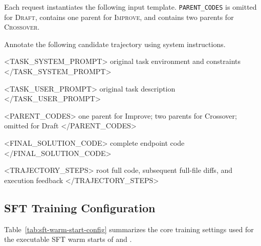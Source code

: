 Each request instantiates the following input template. \texttt{PARENT\_CODES} is omitted for \textsc{Draft}, contains one parent for \textsc{Improve}, and contains two parents for \textsc{Crossover}.

\begin{SandboxTranscript}
Annotate the following candidate trajectory using system instructions.

<TASK_SYSTEM_PROMPT>
{original task environment and constraints}
</TASK_SYSTEM_PROMPT>

<TASK_USER_PROMPT>
{original task description}
</TASK_USER_PROMPT>

<PARENT_CODES>
{one parent for Improve; two parents for Crossover; omitted for Draft}
</PARENT_CODES>

<FINAL_SOLUTION_CODE>
{complete endpoint code}
</FINAL_SOLUTION_CODE>

<TRAJECTORY_STEPS>
{root full code, subsequent full-file diffs, and execution feedback}
</TRAJECTORY_STEPS>
\end{SandboxTranscript}


\subsection{SFT Training Configuration}

Table~\ref{tab:sft-warm-start-config} summarizes the core training settings used for the executable SFT warm starts of \thirtybmodel{} and \thirtyfivebmodel{}.

